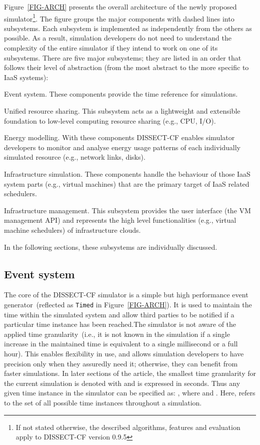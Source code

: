 \documentclass[sort, compress, 5p]{elsarticle}
\newcommand{\SIMULATIONTIME}{}
\begin{document}
Figure~\ref{FIG-ARCH} presents the overall architecture of the newly proposed simulator\footnote{If not stated otherwise, the described algorithms, features and evaluation apply to DISSECT-CF version 0.9.5}. The figure groups the major components with dashed lines into subsystems. Each subsystem is implemented as independently from the others as possible.  As a result, simulation developers do not need to understand the complexity of the entire simulator if they intend to work on one of its subsystems. There are five major subsystems; they are listed in an order that follows their level of abstraction (from the most abstract to the more specific to IaaS systems):
\begin{description*}
\item[Event system.] These components provide the time reference for simulations.
\item[Unified resource sharing.]  \sloppy This subsystem acts as a lightweight and extensible foundation to low-level computing resource sharing (e.g., CPU, I/O).
\item[Energy modelling.] With these components DISSECT-CF enables simulator developers to monitor and analyse energy usage patterns of each individually simulated resource (e.g., network links, disks).
\item[Infrastructure simulation.] These components handle the behaviour of those IaaS system parts (e.g., virtual machines) that are the primary target of IaaS related schedulers.
\item[Infrastructure management.] This subsystem provides the user interface (the VM management API) and represents the high level functionalities (e.g., virtual machine schedulers) of infrastructure clouds.
\end{description*}
In the following sections, these subsystems are individually discussed.

\subsection{Event system}

The core of the DISSECT-CF simulator is a simple but high performance event generator~(reflected as \verb+Timed+ in Figure~\ref{FIG-ARCH}). It is used to maintain the time within the simulated system and allow third parties to be notified if a particular time instance has been reached.The simulator is not aware of the applied time granularity~(i.e., it is not known in the simulation if a single increase in the maintained time is equivalent to a single millisecond or a full hour). This enables flexibility in use, and allows simulation developers to have precision only when they assuredly need it; otherwise, they can benefit from faster simulations. In later sections of the article, the smallest time granularity for the current simulation is denoted with  and is expressed in seconds. Thus any given time instance in the simulator can be specified as: , where  and . Here, \SIMULATIONTIME refers to the set of all possible time instances throughout a simulation.
\end{document}
